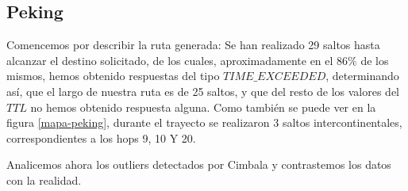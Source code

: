 \subsection{Peking}

Comencemos por describir la ruta generada: Se han realizado 29 saltos hasta alcanzar el destino solicitado, de los cuales, aproximadamente en el $86 \% $ de los mismos, hemos obtenido respuestas del tipo $TIME\_EXCEEDED$, determinando así, que el largo de nuestra ruta es de 25 saltos, y que del resto de los valores del $TTL$ no hemos obtenido respuesta alguna. Como también se puede ver en la figura \ref{mapa-peking}, durante el trayecto se realizaron 3 saltos intercontinentales, correspondientes a los hops 9, 10 Y 20.


Analicemos ahora los outliers detectados por Cimbala y contrastemos los datos con la realidad.

